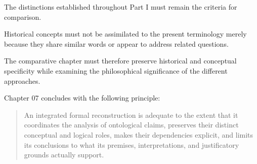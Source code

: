 The distinctions
established throughout
Part I
must remain
the criteria
for comparison.

Historical concepts
must not
be assimilated
to the
present terminology
merely because
they share
similar words
or appear
to address
related questions.

The comparative
chapter must
therefore preserve
historical and
conceptual specificity
while examining
the philosophical
significance of
the different
approaches.

Chapter 07
concludes with
the following
principle:

\begin{quote}
An integrated
formal reconstruction
is adequate
to the
extent that
it coordinates
the analysis
of ontological
claims, preserves
their distinct
conceptual and
logical roles,
makes their
dependencies explicit,
and limits
its conclusions
to what
its premises,
interpretations, and
justificatory grounds
actually support.
\end{quote}

